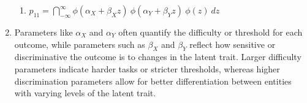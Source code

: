 \begin{enumerate}
\begin{enumerate}
        \item 
        $
            p_{11} 
            = \dint ^{\infty} _{-\infty} \phi(\alpha_X + \beta_X z)\ \phi(\alpha_Y + \beta_Y z)\ \phi(z)\ dz
        $
        \hfill \cite{statistics/book/Statistics-for-Data-Scientists/Maurits-Kaptein}
    \end{enumerate}

    \item Parameters like $\alpha_X$ and $\alpha_Y$ often quantify the difficulty or threshold for each outcome, while parameters such as  $\beta_X$ and $\beta_Y$ reflect how sensitive or discriminative the outcome is to changes in the latent trait. 
    Larger difficulty parameters indicate harder tasks or stricter thresholds, whereas higher discrimination parameters allow for better differentiation between entities with varying levels of the latent trait.
    \hfill \cite{statistics/book/Statistics-for-Data-Scientists/Maurits-Kaptein, common/online/chatgpt}
\end{enumerate}












